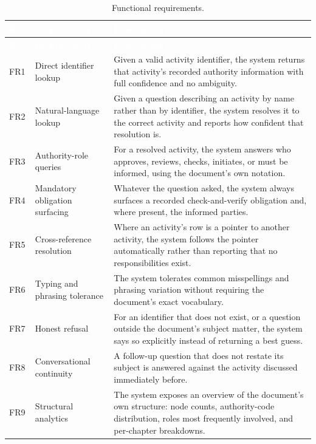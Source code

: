 \begin{longtable}{|p{}|p{}|p{}|}
\caption{Functional requirements.}\label{tab:fr}\\
\hline
\rowcolor{myblue}\textcolor{white}{\textbf{Ref.}} & \textcolor{white}{\textbf{Requirement}} & \textcolor{white}{\textbf{Description}} \\
\hline
\endfirsthead
\hline
\rowcolor{myblue}\textcolor{white}{\textbf{Ref.}} & \textcolor{white}{\textbf{Requirement}} & \textcolor{white}{\textbf{Description}} \\
\hline
\endhead
FR1 & Direct identifier lookup & Given a valid activity identifier, the system returns that activity's recorded authority information with full confidence and no ambiguity. \\ \hline
FR2 & Natural-language lookup & Given a question describing an activity by name rather than by identifier, the system resolves it to the correct activity and reports how confident that resolution is. \\ \hline
FR3 & Authority-role queries & For a resolved activity, the system answers who approves, reviews, checks, initiates, or must be informed, using the document's own notation. \\ \hline
FR4 & Mandatory obligation surfacing & Whatever the question asked, the system always surfaces a recorded check-and-verify obligation and, where present, the informed parties. \\ \hline
FR5 & Cross-reference resolution & Where an activity's row is a pointer to another activity, the system follows the pointer automatically rather than reporting that no responsibilities exist. \\ \hline
FR6 & Typing and phrasing tolerance & The system tolerates common misspellings and phrasing variation without requiring the document's exact vocabulary. \\ \hline
FR7 & Honest refusal & For an identifier that does not exist, or a question outside the document's subject matter, the system says so explicitly instead of returning a best guess. \\ \hline
FR8 & Conversational continuity & A follow-up question that does not restate its subject is answered against the activity discussed immediately before. \\ \hline
FR9 & Structural analytics & The system exposes an overview of the document's own structure: node counts, authority-code distribution, roles most frequently involved, and per-chapter breakdowns. \\ \hline

\end{longtable}
